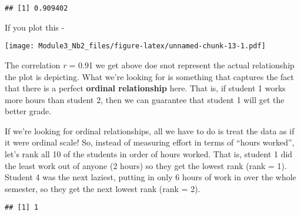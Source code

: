 \documentclass[
]{article}
\newenvironment{Shaded}{\begin{snugshade}}{\end{snugshade}}
\newcommand{\AttributeTok}[1]{\textcolor[rgb]{0.13,0.29,0.53}{#1}}
\newcommand{\CommentTok}[1]{\textcolor[rgb]{0.56,0.35,0.01}{\textit{#1}}}
\newcommand{\ConstantTok}[1]{\textcolor[rgb]{0.56,0.35,0.01}{#1}}
\newcommand{\FunctionTok}[1]{\textcolor[rgb]{0.13,0.29,0.53}{\textbf{#1}}}
\newcommand{\NormalTok}[1]{#1}
\newcommand{\OtherTok}[1]{\textcolor[rgb]{0.56,0.35,0.01}{#1}}
\newcommand{\SpecialCharTok}[1]{\textcolor[rgb]{0.81,0.36,0.00}{\textbf{#1}}}
\begin{document}
\begin{verbatim}
## [1] 0.909402
\end{verbatim}

If you plot this -

\begin{Shaded}
\end{Shaded}

\texttt{[image: Module3\_Nb2\_files/figure-latex/unnamed-chunk-13-1.pdf]}

The correlation \emph{r} = 0.91 we get above doe snot represent the
actual relationship the plot is depicting. What we're looking for is
something that captures the fact that there is a perfect \textbf{ordinal
relationship} here. That is, if student 1 works more hours than student
2, then we can guarantee that student 1 will get the better grade.

If we're looking for ordinal relationships, all we have to do is treat
the data as if it were ordinal scale! So, instead of measuring effort in
terms of ``hours worked'', let's rank all 10 of the students in order of
hours worked. That is, student 1 did the least work out of anyone (2
hours) so they get the lowest rank (rank = 1). Student 4 was the next
laziest, putting in only 6 hours of work in over the whole semester, so
they get the next lowest rank (rank = 2).

\begin{Shaded}
\end{Shaded}

\begin{verbatim}
## [1] 1
\end{verbatim}
\end{document}

